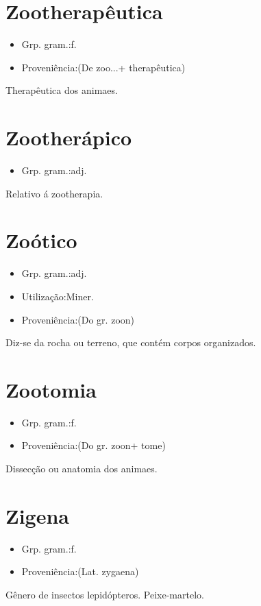 \section{Zootherapêutica}
\begin{itemize}
\item {Grp. gram.:f.}
\end{itemize}
\begin{itemize}
\item {Proveniência:(De \textunderscore zoo...\textunderscore  + \textunderscore therapêutica\textunderscore )}
\end{itemize}
Therapêutica dos animaes.
\section{Zootherápico}
\begin{itemize}
\item {Grp. gram.:adj.}
\end{itemize}
Relativo á zootherapia.
\section{Zoótico}
\begin{itemize}
\item {Grp. gram.:adj.}
\end{itemize}
\begin{itemize}
\item {Utilização:Miner.}
\end{itemize}
\begin{itemize}
\item {Proveniência:(Do gr. \textunderscore zoon\textunderscore )}
\end{itemize}
Diz-se da rocha ou terreno, que contém corpos organizados.
\section{Zootomia}
\begin{itemize}
\item {Grp. gram.:f.}
\end{itemize}
\begin{itemize}
\item {Proveniência:(Do gr. \textunderscore zoon\textunderscore  + \textunderscore tome\textunderscore )}
\end{itemize}
Dissecção ou anatomia dos animaes.
\section{Zigena}
\begin{itemize}
\item {Grp. gram.:f.}
\end{itemize}
\begin{itemize}
\item {Proveniência:(Lat. \textunderscore zygaena\textunderscore )}
\end{itemize}
Gênero de insectos lepidópteros.
Peixe-martelo.
